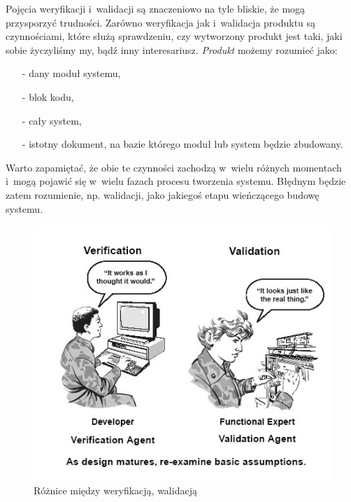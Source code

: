 \documentclass{xmgr}
\begin{document}
Pojęcia weryfikacji i~walidacji są znaczeniowo na tyle bliskie, że mogą przysporzyć trudności. Zarówno weryfikacja jak i~walidacja produktu są czynnościami, które służą sprawdzeniu, czy wytworzony produkt jest taki, jaki sobie życzyliśmy my, bądź inny interesariusz. \textit{Produkt} możemy rozumieć jako: 

\begin{itemize}
  \item[-] dany moduł systemu,
  \item[-] blok kodu,
  \item[-] cały system,
  \item[-] istotny dokument, na bazie którego moduł lub system będzie zbudowany.
\end{itemize}

Warto zapamiętać, że obie te czynności zachodzą w~wielu różnych momentach i~mogą pojawić się w~wielu fazach procesu tworzenia systemu. Błędnym będzie zatem rozumienie, np. walidacji, jako jakiegoś etapu wieńczącego budowę systemu.

\begin{figure}[th!]
\centering
\includegraphics[width=.7\hsize]{images/Verification_Validation_Accreditation}
\caption{Różnice między weryfikacją, walidacją\label{RYS.1}}
\end{figure}
\end{document}
